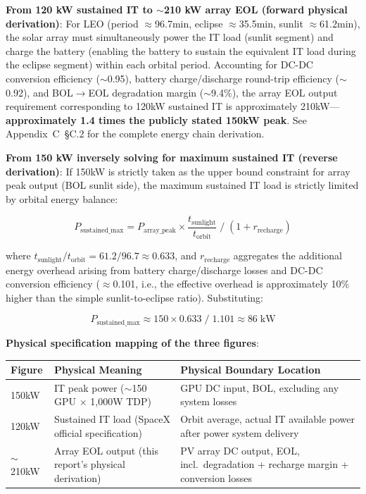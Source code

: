 \textbf{From 120 kW sustained IT to $\sim$210 kW array EOL (forward physical derivation)}: For LEO (period $\approx$96.7\;min, eclipse $\approx$35.5\;min, sunlit $\approx$61.2\;min), the solar array must simultaneously power the IT load (sunlit segment) and charge the battery (enabling the battery to sustain the equivalent IT load during the eclipse segment) within each orbital period. Accounting for DC-DC conversion efficiency ($\sim$0.95), battery charge/discharge round-trip efficiency ($\sim$0.92), and BOL$\to$EOL degradation margin ($\sim$9.4\%), the array EOL output requirement corresponding to 120\;kW sustained IT is approximately 210\;kW---\textbf{approximately 1.4 times the publicly stated 150\;kW peak}. See Appendix~C~\S C.2 for the complete energy chain derivation.

\textbf{From 150 kW inversely solving for maximum sustained IT (reverse derivation)}: If 150\;kW is strictly taken as the upper bound constraint for array peak output (BOL sunlit side), the maximum sustained IT load is strictly limited by orbital energy balance:

\begin{equation}
P_{\text{sustained\_max}} = P_{\text{array\_peak}} \times \frac{t_{\text{sunlight}}}{t_{\text{orbit}}} \;\big/\; (1 + r_{\text{recharge}})
\label{eq:sustained_from_peak}
\end{equation}

where $t_{\text{sunlight}}/t_{\text{orbit}} = 61.2/96.7 \approx 0.633$, and $r_{\text{recharge}}$ aggregates the additional energy overhead arising from battery charge/discharge losses and DC-DC conversion efficiency ($\approx$0.101, i.e., the effective overhead is approximately 10\% higher than the simple sunlit-to-eclipse ratio). Substituting:

\begin{equation}
P_{\text{sustained\_max}} \approx 150 \times 0.633 \;/\; 1.101 \approx 86\;\text{kW}
\label{eq:max_sustained_86}
\end{equation}

\textbf{Physical specification mapping of the three figures}:

\medskip
\noindent
\begin{tabular}{p{3.0cm}p{3.0cm}p{5.5cm}}
\toprule
\textbf{Figure} & \textbf{Physical Meaning} & \textbf{Physical Boundary Location} \\
\midrule
150\;kW & IT peak power ($\sim$150 GPU $\times$ 1,000\;W TDP) & GPU DC input, BOL, excluding any system losses \\
120\;kW & Sustained IT load (SpaceX official specification) & Orbit average, actual IT available power after power system delivery \\
$\sim$210\;kW & Array EOL output (this report's physical derivation) & PV array DC output, EOL, incl.\ degradation + recharge margin + conversion losses \\
\bottomrule
\end{tabular}
\medskip

